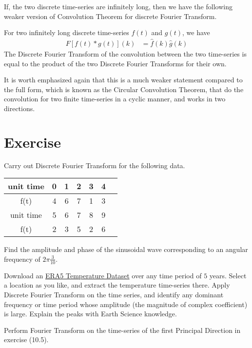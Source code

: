 If, the two discrete time-series are infinitely long, then we have the following weaker version of Convolution Theorem for discrete Fourier Transform.
\begin{thm}
For two infinitely long discrete time-series $f(t)$ and $g(t)$, we have
\begin{align*}
F[f(t) * g(t)](k) &= \hat{f}(k)\hat{g}(k)
\end{align*}
The Discrete Fourier Transform of the convolution between the two time-series is equal to the product of the two Discrete Fourier Transforms for their own.
\end{thm}
It is worth emphasized again that this is a much weaker statement compared to the full form, which is known as the Circular Convolution Theorem, that do the convolution for two finite time-series in a cyclic manner, and works in two directions.

\section{Exercise}
\begin{Exercise}
Carry out Discrete Fourier Transform for the following data.
\begin{center}
\begin{tabular}{|c|c|c|c|c|c|c|}
\hline
unit time & 0 & 1 & 2 & 3 & 4 \\
\hline
f(t) & 4 & 6 & 7 & 1 & 3  \\
\hline
unit time & 5 & 6 & 7 & 8 & 9 \\
\hline
f(t) & 2 & 3 & 5 & 2 & 6\\
\hline
\end{tabular}
\end{center}
Find the amplitude and phase of the sinusoidal wave corresponding to an angular frequency of $2\pi\frac{3}{10}$. 
\end{Exercise}

\begin{Exercise}
Download an \href{https://cds.climate.copernicus.eu/cdsapp#!/dataset/reanalysis-era5-single-levels?tab=overview}{ERA5 Temperature Dataset} over any time period of $5$ years. Select a location as you like, and extract the temperature time-series there. Apply Discrete Fourier Transform on the time series, and identify any dominant frequency or time period whose amplitude (the magnitude of complex coefficient) is large. Explain the peaks with Earth Science knowledge.
\end{Exercise}

\begin{Exercise}
Perform Fourier Transform on the time-series of the first Principal Direction in exercise (10.5).
\end{Exercise}